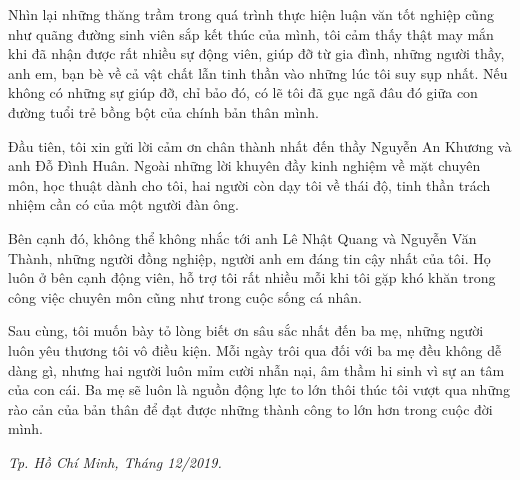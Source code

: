 \cleardoublepage
{}

\begin{dedication}
Nhìn lại những thăng trầm trong quá trình thực hiện luận văn tốt nghiệp cũng như quãng đường sinh viên sắp kết thúc của mình, tôi cảm thấy thật may mắn khi đã nhận được rất nhiều sự động viên, giúp đỡ từ gia đình, những người thầy, anh em, bạn bè về cả vật chất lẫn tinh thần vào những lúc tôi suy sụp nhất. Nếu không có những sự giúp đỡ, chỉ bảo đó, có lẽ tôi đã gục ngã đâu đó giữa con đường tuổi trẻ bồng bột của chính bản thân mình.\par
Đầu tiên, tôi xin gửi lời cảm ơn chân thành nhất đến thầy Nguyễn An Khương và anh Đỗ Đình Huân. Ngoài những lời khuyên đầy kinh nghiệm về mặt chuyên môn, học thuật dành cho tôi, hai người còn dạy tôi về thái độ, tinh thần trách nhiệm cần có của một người đàn ông.\par
Bên cạnh đó, không thể không nhắc tới anh Lê Nhật Quang và Nguyễn Văn Thành, những người đồng nghiệp, người anh em đáng tin cậy nhất của tôi. Họ luôn ở bên cạnh động viên, hỗ trợ tôi rất nhiều mỗi khi tôi gặp khó khăn trong công việc chuyên môn cũng như trong cuộc sống cá nhân.\par
Sau cùng, tôi muốn bày tỏ lòng biết ơn sâu sắc nhất đến ba mẹ, những người luôn yêu thương tôi vô điều kiện. Mỗi ngày trôi qua đối với ba mẹ đều không dễ dàng gì, nhưng hai người luôn mỉm cười nhẫn nại, âm thầm hi sinh vì sự an tâm của con cái. Ba mẹ sẽ luôn là nguồn động lực to lớn thôi thúc tôi vượt qua những rào cản của bản thân để đạt được những thành công to lớn hơn trong cuộc đời mình.
\begin{flushright}
    \textit{Tp. Hồ Chí Minh, Tháng 12/2019.}
\end{flushright}
\end{dedication}
